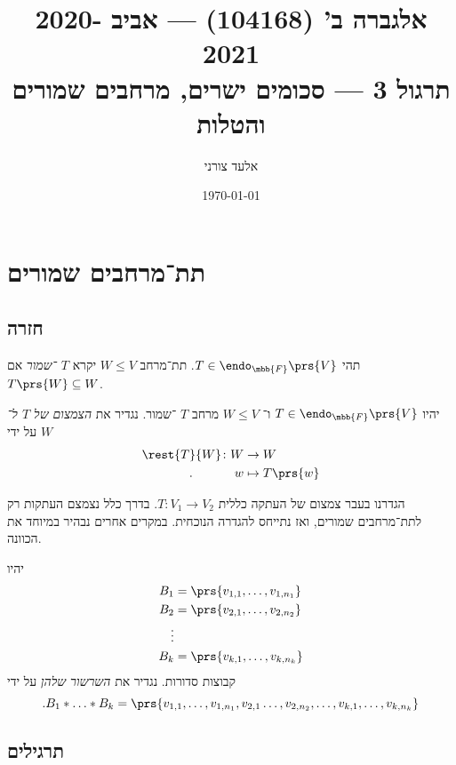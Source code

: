 \documentclass[a4paper,10pt,oneside,openany]{article}
\title{
אלגברה ב' (104168) \textenglish{---} אביב 2020-2021
\\
תרגול 3 \textenglish{---} סכומים ישרים, מרחבים שמורים והטלות
}
\author{אלעד צורני}
\date{\today}
\begin{document}
\maketitle

\section{תת־מרחבים שמורים}

\subsection{חזרה}

\begin{definition}
תהי
$T \in \endo_{\mbb{F}}\prs{V}$.
תת־מרחב
$W \leq V$
יקרא
\emph{$T$%
־שמור}
אם
$T\prs{W} \subseteq W$.
\end{definition}

\begin{definition}
יהיו
$T \in \endo_{\mbb{F}}\prs{V}$
ו־%
$W \leq V$
מרחב
$T$%
־שמור.
נגדיר את
\emph{הצמצום של
$T$
ל־%
$W$}
על ידי
\begin{align*}
\rest{T}{W} \colon W &\to W \\
\text{.} \hphantom{lalalala} w &\mapsto T\prs{w}
\end{align*}
\end{definition}

\begin{remark}
הגדרנו בעבר צמצום של העתקה כללית
$T \colon V_1 \to V_2$.
בדרך כלל נצמצם העתקות רק לתת־מרחבים שמורים, ואז נתייחס להגדרה הנוכחית.
במקרים אחרים נבהיר במיוחד את הכוונה.
\end{remark}

\begin{definition}
יהיו
\begin{align*}
B_1 &= \prs{v_{1,1}, \ldots, v_{1,n_1}} \\
B_2 &= \prs{v_{2,1}, \ldots, v_{2,n_2}} \\
\vdots \\
B_k &= \prs{v_{k,1}, \ldots, v_{k,n_k}}
\end{align*}
קבוצות סדורות.
נגדיר את
\emph{השרשור שלהן}
על ידי
\[\text{.} B_1 * \ldots * B_k = \prs{v_{1,1}, \ldots, v_{1,n_1}, v_{2,1} \ldots, v_{2,n_2}, \ldots, v_{k,1}, \ldots, v_{k, n_k}}\]
\end{definition}

\subsection{תרגילים}
\end{document}
